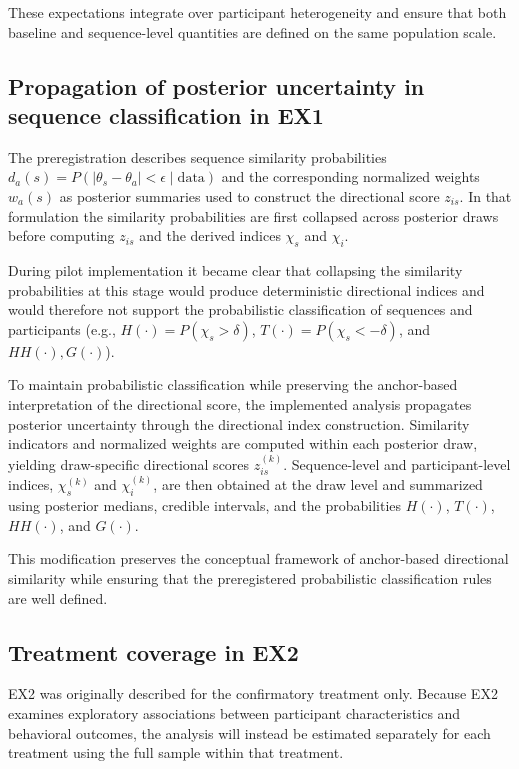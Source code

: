 \documentclass[11pt,a4paper]{article}
\numberwithin{equation}{section}
\begin{document}
These expectations integrate over participant heterogeneity and ensure
that both baseline and sequence-level quantities are defined on the same
population scale.

\subsection{Propagation of posterior uncertainty in sequence classification in EX1}

The preregistration describes sequence similarity probabilities
$d_a(s)=P(|\theta_s-\theta_a|<\epsilon\mid\text{data})$ and the
corresponding normalized weights $w_a(s)$ as posterior summaries used
to construct the directional score $z_{is}$. In that formulation the
similarity probabilities are first collapsed across posterior draws
before computing $z_{is}$ and the derived indices $\chi_s$ and $\chi_i$.

During pilot implementation it became clear that collapsing the
similarity probabilities at this stage would produce deterministic
directional indices and would therefore not support the probabilistic
classification of sequences and participants (e.g.,
$H(\cdot)=P(\chi_s>\delta)$, $T(\cdot)=P(\chi_s<-\delta)$, and
$HH(\cdot),G(\cdot)$).

To maintain probabilistic classification while preserving the
anchor-based interpretation of the directional score, the implemented
analysis propagates posterior uncertainty through the directional index
construction. Similarity indicators and normalized weights are computed
within each posterior draw, yielding draw-specific directional scores
$z_{is}^{(k)}$. Sequence-level and participant-level indices,
$\chi_s^{(k)}$ and $\chi_i^{(k)}$, are then obtained at the draw level
and summarized using posterior medians, credible intervals, and the
probabilities $H(\cdot)$, $T(\cdot)$, $HH(\cdot)$, and $G(\cdot)$.

This modification preserves the conceptual framework of anchor-based
directional similarity while ensuring that the preregistered
probabilistic classification rules are well defined.

\subsection{Treatment coverage in EX2}

EX2 was originally described for the confirmatory treatment only.
Because EX2 examines exploratory associations between participant
characteristics and behavioral outcomes, the analysis will instead
be estimated separately for each treatment using the full sample
within that treatment.
\end{document}
